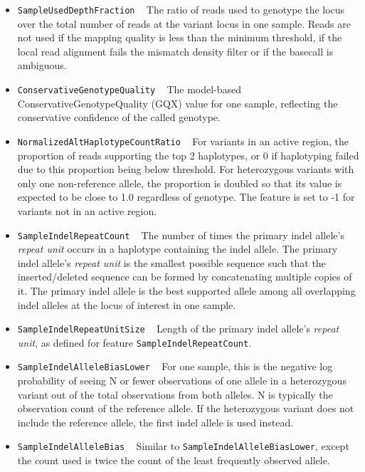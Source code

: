 \documentclass{article}
\begin{document}
\begin{itemize}
    \item \texttt{SampleUsedDepthFraction} ~ The ratio of reads used to genotype the locus over the total number of reads at the variant locus in one sample. Reads are not used if the mapping quality is less than the minimum threshold, if the local read alignment fails the mismatch density filter or if the basecall is ambiguous.

    \item \texttt{ConservativeGenotypeQuality} ~ The model-based ConservativeGenotypeQuality (GQX) value for one sample, reflecting the conservative confidence of the called genotype.

    \item \texttt{NormalizedAltHaplotypeCountRatio} ~ For variants in an active region, the proportion of reads supporting the top 2 haplotypes, or 0 if haplotyping failed due to this proportion being below threshold. For heterozygous variants with only one non-reference allele, the proportion is doubled so that its value is expected to be close to 1.0 regardless of genotype. The feature is set to -1 for variants not in an active region.

    \item \texttt{SampleIndelRepeatCount} ~ The number of times the primary indel allele's \emph{repeat unit} occurs in a haplotype containing the indel allele. The primary indel allele's \emph{repeat unit} is the smallest possible sequence such that the inserted/deleted sequence can be formed by concatenating multiple copies of it. The primary indel allele is the best supported allele among all overlapping indel alleles at the locus of interest in one sample.

    \item \texttt{SampleIndelRepeatUnitSize} ~ Length of the primary indel allele's \emph{repeat unit}, as defined for feature \texttt{SampleIndelRepeatCount}.

    \item \texttt{SampleIndelAlleleBiasLower} ~ For one sample, this is the negative log probability of seeing N or fewer observations of one allele in a heterozygous variant out of the total observations from both alleles. N is typically the observation count of the reference allele. If the heterozygous variant does not include the reference allele, the first indel allele is used instead.

    \item \texttt{SampleIndelAlleleBias} ~ Similar to \texttt{SampleIndelAlleleBiasLower}, except the count used is twice the count of the least frequently observed allele.


\end{itemize}
\end{document}
